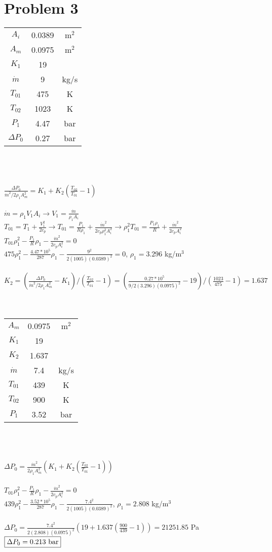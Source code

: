 \documentclass{article}
\begin{document}
\section*{Problem 3}
\begin{tabular}{ccc}
    $A_i$ & 0.0389 & m$^2$ \\
    $A_m$ & 0.0975 & m$^2$ \\
    $K_1$ & 19 \\
    $\dot{m}$ & 9 & kg/s \\
    $T_{01}$ & 475 & K \\
    $T_{02}$ & 1023 & K \\
    $P_1$ & 4.47 & bar \\
    $\Delta P_0$ & 0.27 & bar
\end{tabular} \\\\\\
$\frac{\Delta P_0}{\dot{m}^2/2\rho_1A_m^2}=K_1+K_2(\frac{T_{02}}{T_{01}}-1)$ \\\\
$\dot{m}=\rho_1V_1A_i \rightarrow V_1=\frac{\dot{m}}{\rho_1A_i}$ \\
$T_{01}=T_1+\frac{V_1^2}{2c_p} \rightarrow T_{01}=\frac{P_1}{R\rho_1}+
\frac{\dot{m}^2}{2c_p\rho_1^2A_i^2} \rightarrow \rho_1^2T_{01}=\frac{P_1\rho_1}{R}+\frac{\dot{m}^2}
{2c_pA_i^2}$ \\
$T_{01}\rho_1^2-\frac{P_1}{R}\rho_1-\frac{\dot{m}^2}{2c_pA_i^2}=0$ \\
$475\rho_1^2-\frac{4.47*10^5}{287}\rho_1-\frac{9^2}{2(1005)(0.0389)^2}=0$, \quad
$\rho_1=3.296$ kg/m$^3$ \\\\
$K_2=(\frac{\Delta P_0}{\dot{m}^2/2\rho_1A_m^2}-K_1)/(\frac{T_{02}}{T_{01}}-1)=
(\frac{0.27*10^5}{9/2(3.296)(0.0975)^2}-19)/(\frac{1023}{475}-1)=1.637$ \\\\\\
\begin{tabular}{ccc}
    $A_m$ & 0.0975 & m$^2$ \\
    $K_1$ & 19 \\
    $K_2$ & 1.637 \\
    $\dot{m}$ & 7.4 & kg/s \\
    $T_{01}$ & 439 & K \\
    $T_{02}$ & 900 & K \\
    $P_1$ & 3.52 & bar
\end{tabular} \\\\\\
$\Delta P_0=\frac{\dot{m}^2}{2\rho_1A_m^2}(K_1 + K_2(\frac{T_{02}}{T_{01}}-1))$ \\\\
$T_{01}\rho_1^2-\frac{P_1}{R}\rho_1-\frac{\dot{m}^2}{2c_pA_i^2}=0$ \\
$439\rho_1^2-\frac{3.52*10^5}{287}\rho_1-\frac{7.4^2}{2(1005)(0.0389)^2}$, \quad
$\rho_1=2.808$ kg/m$^3$ \\\\
$\Delta P_0=\frac{7.4^2}{2(2.808)(0.0975)^2}(19+1.637(\frac{900}{439}-1))=21251.85$ Pa \\
$\fbox{$\Delta P_0=0.213$ bar}$
\end{document}
